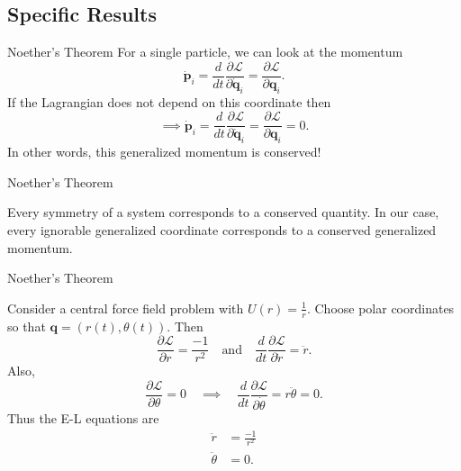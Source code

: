\documentclass[usenames,dvipsnames]{beamer}
\theoremstyle{definition}
\theoremstyle{theorem}
\begin{document}
        
    \subsection{Specific Results}
    
        \begin{frame}{Noether's Theorem}
        For a single particle, we can look at the momentum
            \[
            \mathbf{\dot{p}}_i=\frac{d}{dt}\frac{\partial \mathcal{L}}{\partial \mathbf{\dot{q}}_i}=\frac{\partial \mathcal{L}}{\partial \mathbf{q}_i}.
            \]
        If the Lagrangian does not depend on this coordinate then
            \[
            \implies \mathbf{\dot{p}}_i=\frac{d}{dt}\frac{\partial \mathcal{L}}{\partial \mathbf{\dot{q}}_i}=\frac{\partial \mathcal{L}}{\partial \mathbf{q}_i}=0.
            \]
        In other words, this generalized momentum is conserved!
        \end{frame}
        
        \begin{frame}{Noether's Theorem}
            \begin{theorem}
                Every symmetry of a system corresponds to a conserved quantity.  In our case, every ignorable generalized coordinate corresponds to a conserved generalized momentum.
            \end{theorem}
        \end{frame}
        
        \begin{frame}{Noether's Theorem}
            \begin{example}
                Consider a central force field problem with $U(r)=\frac{1}{r}$. Choose polar coordinates so that $\mathbf{q}=(r(t),\theta(t)).$ Then
                \[
                \frac{\partial \mathcal{L}}{\partial r}=\frac{-1}{r^2}\quad \textrm{and}\quad \frac{d}{dt}\frac{\partial \mathcal{L}}{\partial \dot{r}}=\ddot{r}.
                \]
                Also,
                \[
                \frac{\partial \mathcal{L}}{\partial \theta}=0 \quad \implies\quad \frac{d}{dt}\frac{\partial \mathcal{L}}{\partial \dot{\theta}}=r\ddot{\theta}=0.
                \]
                Thus the E-L equations are
                \begin{align*}
                    \ddot{r}&=\frac{-1}{r^2}\\
                    \ddot{\theta}&=0.
                \end{align*}
            \end{example}
        \end{frame}
        
\end{document}
